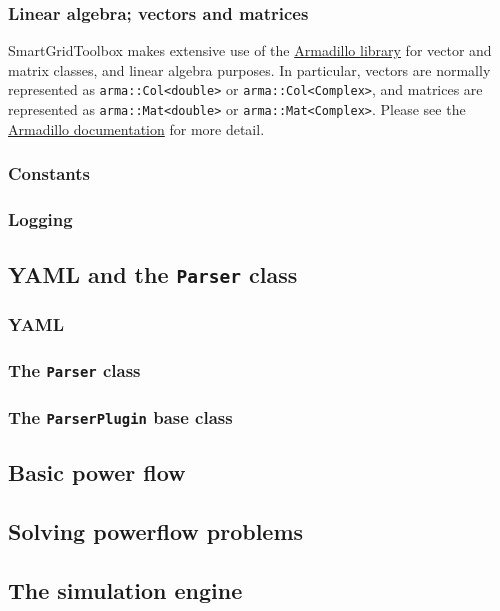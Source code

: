 \documentclass[10pt]{article}
\begin{document}
\subsubsection{Linear algebra; vectors and matrices}
SmartGridToolbox makes extensive use of the \href{http://arma.sourceforge.net}{Armadillo library} for vector and matrix classes, and linear algebra purposes. In particular, vectors are normally represented as \verb|arma::Col<double>| or \verb|arma::Col<Complex>|, and matrices are represented as \verb|arma::Mat<double>| or \verb|arma::Mat<Complex>|. Please see the \href{http://arma.sourceforge.net/docs.html}{Armadillo documentation} for more detail.
\subsubsection{Constants}
\subsubsection{Logging}
\subsection{YAML and the \texttt{Parser} class}
\subsubsection{YAML}
\subsubsection{The \texttt{Parser} class}
\subsubsection{The \texttt{ParserPlugin} base class}
\subsection{Basic power flow}
\subsection{Solving powerflow problems}
\subsection{The simulation engine}
\end{document}
